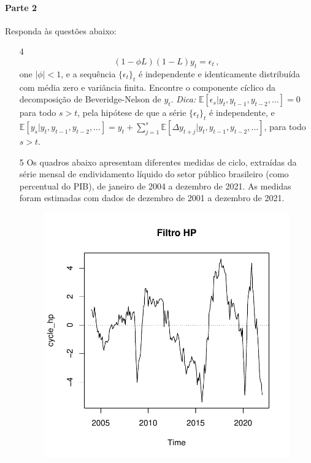 \documentclass[10pt,a4paper]{article}
\begin{document}
			\paragraph{Parte 2} Responda às questões abaixo:
			\begin{enumerate}
				\item[4] 		
				$$(1-\phi L) (1-L)y_t = \epsilon_t \, ,$$
				one $|\phi|<1$, e a sequência $\{\epsilon_t\}_t$ é independente e identicamente distribuída com média zero e variância finita. Encontre o componente cíclico da decomposição de Beveridge-Nelson de $y_t$. \textit{Dica:} $\mathbb{E}[\epsilon_s| y_{t}, y_{t-1}, y_{t-2}, \ldots ] = 0$ para todo $s > t$, pela hipótese de que a série $\{\epsilon_t\}_t$ é independente, e $\mathbb{E}[y_{s}| y_{t}, y_{t-1}, y_{t-2}, \ldots ] = y_t + \sum_{j=1}^s \mathbb{E}[\Delta y_{t+j}| y_{t}, y_{t-1}, y_{t-2}, \ldots ]$, para todo $s > t$.
				\item[5]  Os quadros abaixo apresentam diferentes medidas de ciclo, extraídas da série mensal de endividamento líquido do setor público brasileiro (como percentual do PIB), de janeiro de 2004 a dezembro de 2021. As medidas foram estimadas com dados de dezembro de 2001 a dezembro de 2021.
				\begin{figure}[H]
					\includegraphics[scale=0.47]{hp.pdf}

\end{figure}
\end{enumerate}
\end{document}
